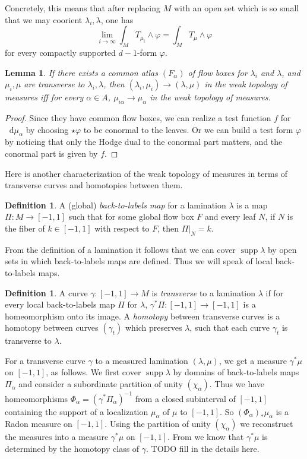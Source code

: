 \documentclass[reqno,10pt]{amsart}
\newcommand*\dif{\mathop{}\!\mathrm{d}}
\DeclareMathOperator{\supp}{supp}
\newcommand{\dfn}[1]{\emph{#1}\index{#1}}
\newtheorem{lemma}[theorem]{Lemma}
\theoremstyle{definition}
\newtheorem{definition}[theorem]{Definition}
\numberwithin{equation}{section}
\begin{document}
Concretely, this means that after replacing $M$ with an open set which is so small that we may coorient $\lambda_i, \lambda$, one has 
$$\lim_{i \to \infty} \int_M T_{\mu_i} \wedge \varphi = \int_M T_\mu \wedge \varphi$$
for every compactly supported $d-1$-form $\varphi$.

\begin{lemma}
If there exists a common atlas $(F_\alpha)$ of flow boxes for $\lambda_i$ and $\lambda$, and $\mu_i, \mu$ are transverse to $\lambda_i, \lambda$, then $(\lambda_i, \mu_i) \to (\lambda, \mu)$ in the weak topology of measures iff for every $\alpha \in A$, $\mu_{i\alpha} \to \mu_\alpha$ in the weak topology of measures.
\end{lemma}
\begin{proof}
Since they have common flow boxes, we can realize a test function $f$ for $\dif \mu_\alpha$ by choosing $\star \varphi$ to be conormal to the leaves.
Or we can build a test form $\varphi$ by noticing that only the Hodge dual to the conormal part matters, and the conormal part is given by $f$.
\end{proof}

Here is another characterization of the weak topology of measures in terms of transverse curves and homotopies between them.

\begin{definition}
A (global) \dfn{back-to-labels map} for a lamination $\lambda$ is a map $\Pi: M \to [-1, 1]$ such that for some global flow box $F$ and every leaf $N$, if $N$ is the fiber of $k \in [-1, 1]$ with respect to $F$, then $\Pi|_N = k$.
\end{definition}

From the definition of a lamination it follows that we can cover $\supp \lambda$ by open sets in which back-to-labels maps are defined.
Thus we will speak of local back-to-labels maps.

\begin{definition}
A curve $\gamma: [-1, 1] \to M$ is \dfn{transverse} to a lamination $\lambda$ if for every local back-to-labels map $\Pi$ for $\lambda$, $\gamma^* \Pi: [-1, 1] \to [-1, 1]$ is a homeomorphism onto its image.
A \dfn{homotopy} between transverse curves is a homotopy between curves $(\gamma_t)$ which preserves $\lambda$, such that each curve $\gamma_t$ is transverse to $\lambda$.
\end{definition}

For a transverse curve $\gamma$ to a measured lamination $(\lambda, \mu)$, we get a measure $\gamma^* \mu$ on $[-1, 1]$, as follows.
We first cover $\supp \lambda$ by domains of back-to-labels maps $\Pi_\alpha$ and consider a subordinate partition of unity $(\chi_\alpha)$.
Thus we have homeomorphisms $\Phi_\alpha = (\gamma^* \Pi_\alpha)^{-1}$ from a closed subinterval of $[-1, 1]$ containing the support of a localization $\mu_\alpha$ of $\mu$ to $[-1, 1]$.
So $(\Phi_\alpha)_* \mu_\alpha$ is a Radon measure on $[-1, 1]$.
Using the partition of unity $(\chi_\alpha)$ we reconstruct the measures into a measure $\gamma^* \mu$ on $[-1, 1]$.
From \cite[\S7]{daskalopoulos2020transverse} we know that $\gamma^* \mu$ is determined by the homotopy class of $\gamma$.
TODO fill in the details here.
\end{document}
